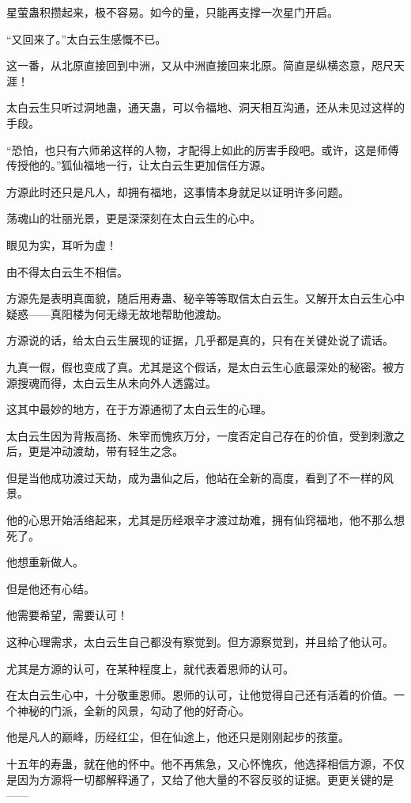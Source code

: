 \begin{this_body}
星萤蛊积攒起来，极不容易。如今的量，只能再支撑一次星门开启。

“又回来了。”太白云生感慨不已。

这一番，从北原直接回到中洲，又从中洲直接回来北原。简直是纵横恣意，咫尺天涯！

太白云生只听过洞地蛊，通天蛊，可以令福地、洞天相互沟通，还从未见过这样的手段。

“恐怕，也只有六师弟这样的人物，才配得上如此的厉害手段吧。或许，这是师傅传授他的。”狐仙福地一行，让太白云生更加信任方源。

方源此时还只是凡人，却拥有福地，这事情本身就足以证明许多问题。

荡魂山的壮丽光景，更是深深刻在太白云生的心中。

眼见为实，耳听为虚！

由不得太白云生不相信。

方源先是表明真面貌，随后用寿蛊、秘辛等等取信太白云生。又解开太白云生心中疑惑——真阳楼为何无缘无故地帮助他渡劫。

方源说的话，给太白云生展现的证据，几乎都是真的，只有在关键处说了谎话。

九真一假，假也变成了真。尤其是这个假话，是太白云生心底最深处的秘密。被方源搜魂而得，太白云生从未向外人透露过。

这其中最妙的地方，在于方源通彻了太白云生的心理。

太白云生因为背叛高扬、朱宰而愧疚万分，一度否定自己存在的价值，受到刺激之后，更是冲动渡劫，带有轻生之念。

但是当他成功渡过天劫，成为蛊仙之后，他站在全新的高度，看到了不一样的风景。

他的心思开始活络起来，尤其是历经艰辛才渡过劫难，拥有仙窍福地，他不那么想死了。

他想重新做人。

但是他还有心结。

他需要希望，需要认可！

这种心理需求，太白云生自己都没有察觉到。但方源察觉到，并且给了他认可。

尤其是方源的认可，在某种程度上，就代表着恩师的认可。

在太白云生心中，十分敬重恩师。恩师的认可，让他觉得自己还有活着的价值。一个神秘的门派，全新的风景，勾动了他的好奇心。

他是凡人的巅峰，历经红尘，但在仙途上，他还只是刚刚起步的孩童。

十五年的寿蛊，就在他的怀中。他不再焦急，又心怀愧疚，他选择相信方源，不仅是因为方源将一切都解释通了，又给了他大量的不容反驳的证据。更更关键的是——


\end{this_body}
